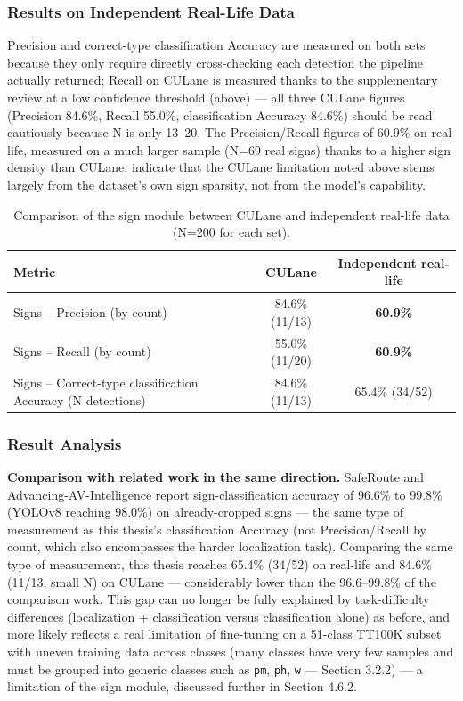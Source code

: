 \documentclass[12pt,a4paper]{report}
\begin{document}
\subsubsection*{Results on Independent Real-Life Data}

Precision and correct-type classification Accuracy are measured on both sets because they only require directly cross-checking each detection the pipeline actually returned; Recall on CULane is measured thanks to the supplementary review at a low confidence threshold (above) --- all three CULane figures (Precision 84.6\%, Recall 55.0\%, classification Accuracy 84.6\%) should be read cautiously because N is only 13--20. The Precision/Recall figures of 60.9\% on real-life, measured on a much larger sample (N=69 real signs) thanks to a higher sign density than CULane, indicate that the CULane limitation noted above stems largely from the dataset's own sign sparsity, not from the model's capability.

\begin{table}[htbp]
    \centering
    \small
    \caption{Comparison of the sign module between CULane and independent real-life data (N=200 for each set).}
    \label{tab:4.3b}
    \begin{tabular}{@{}p{6.5cm}cc@{}}
        \toprule
        \textbf{Metric} & \textbf{CULane} & \textbf{Independent real-life} \\
        \midrule
        Signs -- Precision (by count) & 84.6\% (11/13) & \textbf{60.9\%} \\
        Signs -- Recall (by count) & 55.0\% (11/20) & \textbf{60.9\%} \\
        Signs -- Correct-type classification Accuracy (N detections) & 84.6\% (11/13) & 65.4\% (34/52) \\
        \bottomrule
    \end{tabular}
\end{table}

\subsubsection*{Result Analysis}

\textbf{Comparison with related work in the same direction.} SafeRoute and Advancing-AV-Intelligence \cite{shaw2025saferoute,sah2025advancing} report sign-classification accuracy of 96.6\% to 99.8\% (YOLOv8 reaching 98.0\%) on already-cropped signs --- the same type of measurement as this thesis's classification Accuracy (not Precision/Recall by count, which also encompasses the harder localization task). Comparing the same type of measurement, this thesis reaches 65.4\% (34/52) on real-life and 84.6\% (11/13, small N) on CULane --- considerably lower than the 96.6--99.8\% of the comparison work. This gap can no longer be fully explained by task-difficulty differences (localization + classification versus classification alone) as before, and more likely reflects a real limitation of fine-tuning on a 51-class TT100K subset with uneven training data across classes (many classes have very few samples and must be grouped into generic classes such as \texttt{pm}, \texttt{ph}, \texttt{w} --- Section 3.2.2) --- a limitation of the sign module, discussed further in Section 4.6.2.
\end{document}
